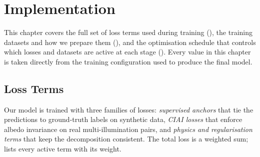 \chapter{Implementation}
\label{ch:implementation}

This chapter covers the full set of loss terms used during training
(), the training datasets and how we prepare them
(), and the optimisation schedule that controls which losses
and datasets are active at each stage ().
Every value in this chapter is taken directly from the training configuration
used to produce the final model.


\section{Loss Terms}
\label{sec:losses}

Our model is trained with three families of losses: \emph{supervised anchors}
that tie the predictions to ground-truth labels on synthetic data, \emph{CIAI
losses} that enforce albedo invariance on real multi-illumination pairs, and
\emph{physics and regularisation terms} that keep the decomposition consistent.
The total loss is a weighted sum;  lists every active term
with its weight.

